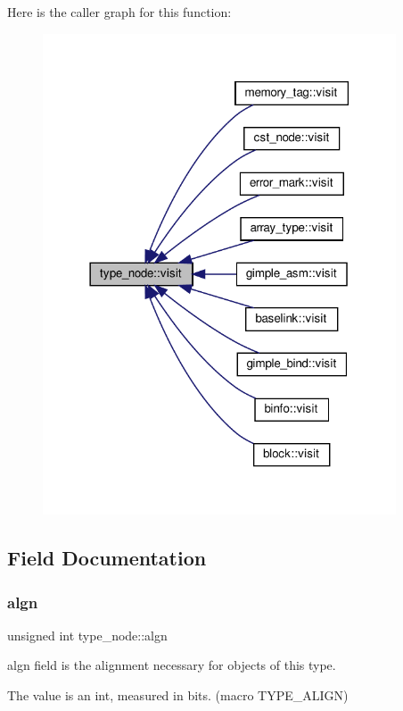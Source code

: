 Here is the caller graph for this function\+:
\nopagebreak
\begin{figure}[H]
\begin{center}
\leavevmode
\includegraphics[width=297pt]{d9/d11/structtype__node_adc6e447af5f9505e6305320933c46a96_icgraph}
\end{center}
\end{figure}


\subsection{Field Documentation}
\mbox{\label{structtype__node_a77e914d5fc90882ff838ebe47dbbe5d4}} 
\subsubsection{\texorpdfstring{algn}{algn}}
{\footnotesize\ttfamily unsigned int type\+\_\+node\+::algn}



algn field is the alignment necessary for objects of this type. 

The value is an int, measured in bits. (macro T\+Y\+P\+E\+\_\+\+A\+L\+I\+GN) 

